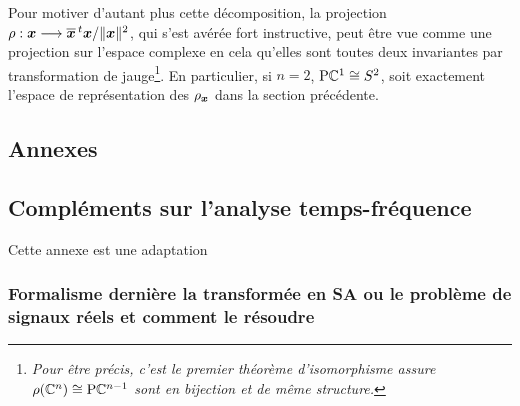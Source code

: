 Pour motiver d'autant plus cette décomposition, la projection $\rho : \boldsymbol{x} \longrightarrow \overline{\boldsymbol{x}}\,^t\boldsymbol{x} / \|\boldsymbol{x}\|^2$, qui s'est avérée fort instructive, peut être vue comme une projection sur l'espace complexe en cela qu'elles sont toutes deux invariantes par transformation de jauge\footnote{\itshape
	Pour être précis, c'est le premier théorème d'isomorphisme assure $\rho(\mathbb{C}^n) \cong\text{\normalfont P}\mathbb{C}^{n-1}$ sont en bijection et de même structure.}.
En particulier, si $n=2$, $\text{\normalfont P}\mathbb{C}^{1}\cong S^{2}$, soit exactement l'espace de représentation des $\rho_{\boldsymbol{x}}$ dans la section précédente.







\begin{annexe}

\section{Annexes}

\subsection{Compléments sur l'analyse temps-fréquence}\label{ann:complement_t-f}

Cette annexe est une adaptation 

\subsubsection{\wip Formalisme dernière la transformée en SA ou le problème de signaux réels et comment le résoudre}\label{sec:transfo_SA}


\end{annexe}
